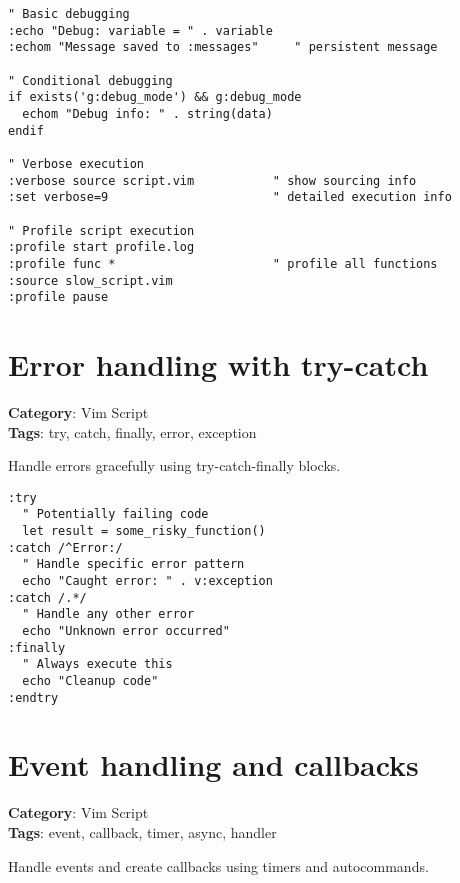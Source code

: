 {{{{{{{{{{{{{{{{{{{\begin{Exa*}{}
\begin{Verbatim}[fontsize=\footnotesize, breaklines, breakanywhere]
" Basic debugging
:echo "Debug: variable = " . variable
:echom "Message saved to :messages"     " persistent message

" Conditional debugging
if exists('g:debug_mode') && g:debug_mode
  echom "Debug info: " . string(data)
endif

" Verbose execution
:verbose source script.vim           " show sourcing info
:set verbose=9                       " detailed execution info

" Profile script execution
:profile start profile.log
:profile func *                      " profile all functions
:source slow_script.vim
:profile pause
\end{Verbatim}
\end{Exa*}

\section{Error handling with try-catch}

\textbf{Category}: Vim Script\\ \textbf{Tags}: try, catch, finally, error, exception
\vspace{0.5cm}

Handle errors gracefully using try-catch-finally blocks.

\begin{Exa*}{}
\begin{Verbatim}[fontsize=\footnotesize, breaklines, breakanywhere]
:try
  " Potentially failing code
  let result = some_risky_function()
:catch /^Error:/
  " Handle specific error pattern
  echo "Caught error: " . v:exception
:catch /.*/
  " Handle any other error
  echo "Unknown error occurred"
:finally
  " Always execute this
  echo "Cleanup code"
:endtry
\end{Verbatim}
\end{Exa*}

\section{Event handling and callbacks}

\textbf{Category}: Vim Script\\ \textbf{Tags}: event, callback, timer, async, handler
\vspace{0.5cm}

Handle events and create callbacks using timers and autocommands.

}}}}}}}}}}}}}}}}}}}
